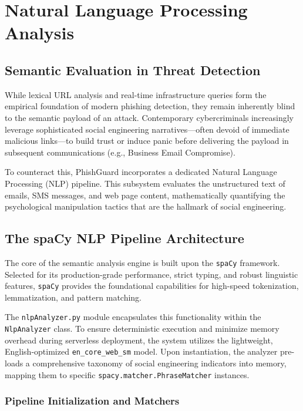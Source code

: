 \chapter{Natural Language Processing
Analysis}
\label{chapter-6-natural-language-processing-analysis}

\section{Semantic Evaluation in Threat
Detection}\label{semantic-evaluation-in-threat-detection}

While lexical URL analysis and real-time infrastructure queries form the
empirical foundation of modern phishing detection, they remain
inherently blind to the semantic payload of an attack. Contemporary
cybercriminals increasingly leverage sophisticated social engineering
narratives---often devoid of immediate malicious links---to build trust
or induce panic before delivering the payload in subsequent
communications (e.g., Business Email Compromise).

To counteract this, PhishGuard incorporates a dedicated Natural Language
Processing (NLP) pipeline. This subsystem evaluates the unstructured
text of emails, SMS messages, and web page content, mathematically
quantifying the psychological manipulation tactics that are the hallmark
of social engineering.

\section{The spaCy NLP Pipeline
Architecture}\label{the-spacy-nlp-pipeline-architecture}

The core of the semantic analysis engine is built upon the
\texttt{spaCy} framework. Selected for its production-grade performance,
strict typing, and robust linguistic features, \texttt{spaCy} provides
the foundational capabilities for high-speed tokenization,
lemmatization, and pattern matching.

The \texttt{nlpAnalyzer.py} module encapsulates this functionality
within the \texttt{NlpAnalyzer} class. To ensure deterministic execution
and minimize memory overhead during serverless deployment, the system
utilizes the lightweight, English-optimized \texttt{en\_core\_web\_sm}
model. Upon instantiation, the analyzer pre-loads a comprehensive
taxonomy of social engineering indicators into memory, mapping them to
specific \texttt{spacy.matcher.PhraseMatcher} instances.

\subsection{Pipeline Initialization and
Matchers}\label{pipeline-initialization-and-matchers}

